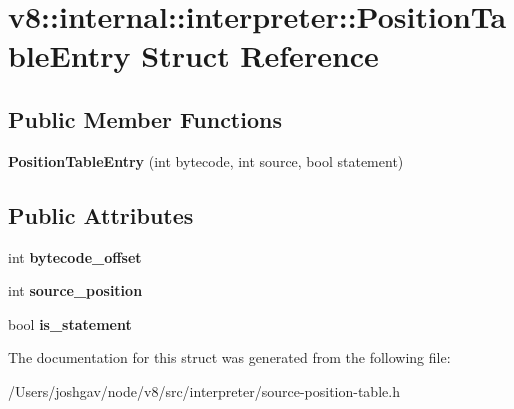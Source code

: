 \hypertarget{structv8_1_1internal_1_1interpreter_1_1_position_table_entry}{}\section{v8\+:\+:internal\+:\+:interpreter\+:\+:Position\+Table\+Entry Struct Reference}
\label{structv8_1_1internal_1_1interpreter_1_1_position_table_entry}
\subsection*{Public Member Functions}
\begin{DoxyCompactItemize}
\item 
{\bfseries Position\+Table\+Entry} (int bytecode, int source, bool statement)\hypertarget{structv8_1_1internal_1_1interpreter_1_1_position_table_entry_ac26f82bd853c362fd7aa7b5de35fd5ce}{}\label{structv8_1_1internal_1_1interpreter_1_1_position_table_entry_ac26f82bd853c362fd7aa7b5de35fd5ce}

\end{DoxyCompactItemize}
\subsection*{Public Attributes}
\begin{DoxyCompactItemize}
\item 
int {\bfseries bytecode\+\_\+offset}\hypertarget{structv8_1_1internal_1_1interpreter_1_1_position_table_entry_a20fa3e6f33215739fc414d2de35af584}{}\label{structv8_1_1internal_1_1interpreter_1_1_position_table_entry_a20fa3e6f33215739fc414d2de35af584}

\item 
int {\bfseries source\+\_\+position}\hypertarget{structv8_1_1internal_1_1interpreter_1_1_position_table_entry_a0a01cb40d5fa80255b55103821215712}{}\label{structv8_1_1internal_1_1interpreter_1_1_position_table_entry_a0a01cb40d5fa80255b55103821215712}

\item 
bool {\bfseries is\+\_\+statement}\hypertarget{structv8_1_1internal_1_1interpreter_1_1_position_table_entry_a459291a645d4b24b8b0f190dc34bec11}{}\label{structv8_1_1internal_1_1interpreter_1_1_position_table_entry_a459291a645d4b24b8b0f190dc34bec11}

\end{DoxyCompactItemize}


The documentation for this struct was generated from the following file\+:\begin{DoxyCompactItemize}
\item 
/\+Users/joshgav/node/v8/src/interpreter/source-\/position-\/table.\+h\end{DoxyCompactItemize}
